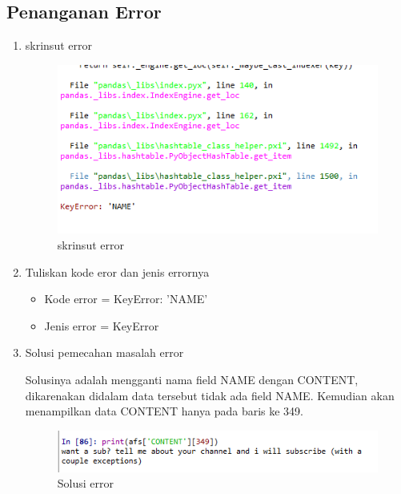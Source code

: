 \subsection{Penanganan Error}
\begin{enumerate}
	\item skrinsut error
		\begin{figure}[ht]
		\centering
		\includegraphics[scale=0.5]{figures/AFS/a12.png}
		\caption{skrinsut error}
		\label{contoh}
		\end{figure}
	\item Tuliskan kode eror dan jenis errornya
		\begin{itemize}
		\item Kode error = KeyError: 'NAME'
		\item Jenis error = KeyError
		\end{itemize}
	\item Solusi pemecahan masalah error
		\par Solusinya adalah mengganti nama field NAME dengan CONTENT, dikarenakan didalam data tersebut tidak ada field NAME. Kemudian akan menampilkan data CONTENT hanya pada baris ke 349. 
		\begin{figure}[ht]
		\centering
		\includegraphics[scale=0.5]{figures/AFS/a13.png}
		\caption{Solusi error}
		\label{contoh}
		\end{figure}
	
\end{enumerate}